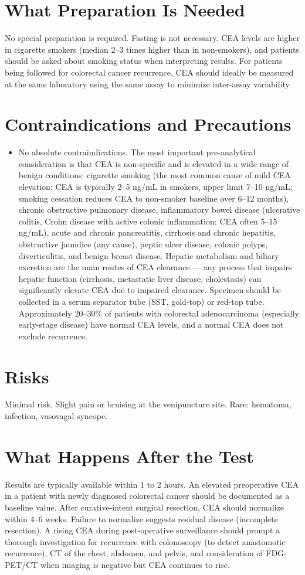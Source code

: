 \section*{What Preparation Is Needed}
No special preparation is required. Fasting is not necessary. CEA levels are higher in cigarette smokers (median 2--3 times higher than in non-smokers), and patients should be asked about smoking status when interpreting results. For patients being followed for colorectal cancer recurrence, CEA should ideally be measured at the same laboratory using the same assay to minimize inter-assay variability.

\section*{Contraindications and Precautions}
\begin{itemize}
  \item No absolute contraindications. The most important pre-analytical consideration is that CEA is non-specific and is elevated in a wide range of benign conditions: cigarette smoking (the most common cause of mild CEA elevation; CEA is typically 2--5 ng/mL in smokers, upper limit 7--10 ng/mL; smoking cessation reduces CEA to non-smoker baseline over 6--12 months), chronic obstructive pulmonary disease, inflammatory bowel disease (ulcerative colitis, Crohn disease with active colonic inflammation; CEA often 5--15 ng/mL), acute and chronic pancreatitis, cirrhosis and chronic hepatitis, obstructive jaundice (any cause), peptic ulcer disease, colonic polyps, diverticulitis, and benign breast disease. Hepatic metabolism and biliary excretion are the main routes of CEA clearance --- any process that impairs hepatic function (cirrhosis, metastatic liver disease, cholestasis) can significantly elevate CEA due to impaired clearance. Specimen should be collected in a serum separator tube (SST, gold-top) or red-top tube. Approximately 20--30\% of patients with colorectal adenocarcinoma (especially early-stage disease) have normal CEA levels, and a normal CEA does not exclude recurrence.
\end{itemize}
\section*{Risks}
Minimal risk. Slight pain or bruising at the venipuncture site. Rare: hematoma, infection, vasovagal syncope.

\section*{What Happens After the Test}
Results are typically available within 1 to 2 hours. An elevated preoperative CEA in a patient with newly diagnosed colorectal cancer should be documented as a baseline value. After curative-intent surgical resection, CEA should normalize within 4--6 weeks. Failure to normalize suggests residual disease (incomplete resection). A rising CEA during post-operative surveillance should prompt a thorough investigation for recurrence with colonoscopy (to detect anastomotic recurrence), CT of the chest, abdomen, and pelvis, and consideration of FDG-PET/CT when imaging is negative but CEA continues to rise.


